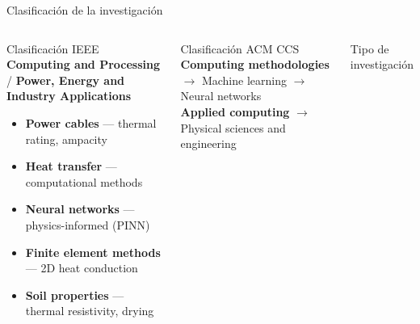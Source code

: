 \documentclass[aspectratio=169]{beamer}
\begin{document}
\begin{frame}{Clasificación de la investigación}
\begin{columns}[T]

\begin{block}{\normalsize Clasificación IEEE}
\scriptsize\textbf{Computing and Processing} /
\textbf{Power, Energy and Industry Applications}
\vspace{0.25em}
\begin{itemize}[leftmargin=*,nosep]\scriptsize
  \item \textbf{Power cables} --- thermal rating, ampacity
  \item \textbf{Heat transfer} --- computational methods
  \item \textbf{Neural networks} --- physics-informed (PINN)
  \item \textbf{Finite element methods} --- 2D heat conduction
  \item \textbf{Soil properties} --- thermal resistivity, drying
\end{itemize}
\end{block}

\vspace{0.4em}
\begin{block}{\normalsize Clasificación ACM CCS}
\scriptsize
\textbf{Computing methodologies} $\to$ Machine learning $\to$ Neural networks\\[2pt]
\textbf{Applied computing} $\to$ Physical sciences and engineering
\end{block}

\begin{alertblock}{\normalsize Tipo de investigación}
\vspace{0.35em}


\vspace{0.45em}

\vspace{0.3em}
\end{alertblock}


\end{columns}
\end{frame}
\end{document}
